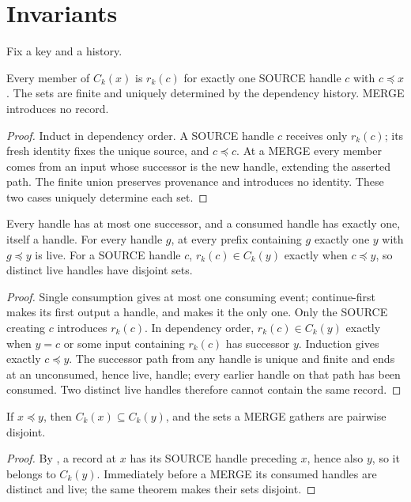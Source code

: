 \documentclass[../main.tex]{subfiles}
\begin{document}
\section{Invariants}
\label{sec:kpc:invariants}

Fix a key and a history.

\begin{theorem}
\label{thm:kpc-invariants:source-provenance}
Every member of $C_k(x)$ is $r_k(c)$ for exactly one SOURCE handle $c$
with $c\preceq x$. The sets are finite and uniquely determined by the
dependency history. MERGE introduces no record.
\end{theorem}
\begin{proof}
Induct in dependency order. A SOURCE handle $c$ receives only $r_k(c)$;
its fresh identity fixes the unique source, and $c\preceq c$.
At a MERGE every member comes from an input whose successor is the new
handle, extending the asserted path. The finite union preserves provenance
and introduces no identity. These two cases uniquely determine each set.
\end{proof}

\begin{theorem}
\label{thm:kpc-invariants:unique-successor}
Every handle has at most one successor, and a consumed handle has exactly
one, itself a handle. For every handle $g$, at every prefix containing
$g$ exactly one $y$ with $g\preceq y$ is live. For a SOURCE handle $c$,
$r_k(c)\in C_k(y)$ exactly when $c\preceq y$, so distinct live handles
have disjoint sets.
\end{theorem}
\begin{proof}
Single consumption gives at most one consuming event; continue-first
makes its first output a handle, and  makes it the only one.
Only the SOURCE creating $c$ introduces $r_k(c)$. In dependency order,
$r_k(c)\in C_k(y)$ exactly when $y=c$ or some input containing $r_k(c)$
has successor $y$. Induction gives exactly $c\preceq y$. The successor
path from any handle is unique and finite and ends at an unconsumed,
hence live, handle; every earlier handle on that path has been consumed.
Two distinct live handles therefore cannot contain the same record.
\end{proof}

\begin{theorem}
\label{thm:kpc-invariants:set-membership-growth}
If $x\preceq y$, then $C_k(x)\subseteq C_k(y)$, and the sets a MERGE
gathers are pairwise disjoint.
\end{theorem}
\begin{proof}
By , a record at $x$ has its
SOURCE handle preceding $x$, hence also $y$, so it belongs to $C_k(y)$.
Immediately before a MERGE its consumed handles are distinct and live;
the same theorem makes their sets disjoint.
\end{proof}
\end{document}
